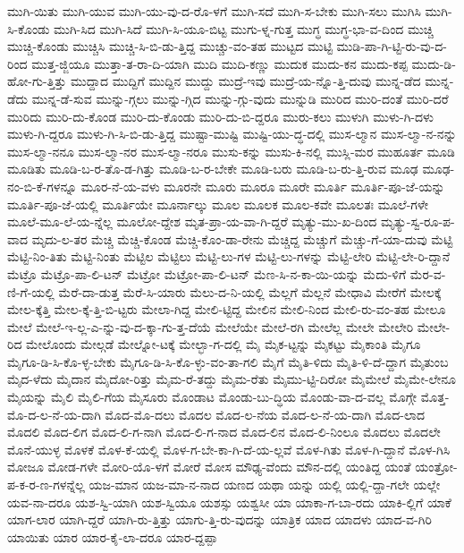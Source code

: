 {ಮುಗಿ-ಯಿತು
ಮುಗಿ-ಯುವ
ಮುಗಿ-ಯು-ವು-ದ-ರೊ-ಳಗೆ
ಮುಗಿ-ಸದೆ
ಮುಗಿ-ಸ-ಬೇಕು
ಮುಗಿ-ಸಲು
ಮುಗಿಸಿ
ಮುಗಿ-ಸಿ-ಕೊಂಡು
ಮುಗಿ-ಸಿದ
ಮುಗಿ-ಸಿದೆ
ಮುಗಿ-ಸಿ-ಯೂ-ಬಿಟ್ಟ
ಮುಗು-ಳ್ನ-ಗುತ್ತ
ಮುಗ್ಧ
ಮುಗ್ಧ-ಭಾ-ವ-ದಿಂದ
ಮುಚ್ಚಿ
ಮುಚ್ಚಿ-ಕೊಂಡು
ಮುಚ್ಚಿಸಿ
ಮುಚ್ಚಿ-ಸಿ-ಬಿ-ಡು-ತ್ತಿದ್ದ
ಮುಚ್ಚು-ವಂ-ತಹ
ಮುಟ್ಟದ
ಮುಟ್ಟಿ
ಮುಡಿ-ಪಾ-ಗಿ-ಟ್ಟಿ-ರು-ವು-ದ-ರಿಂದ
ಮುತ್ತ-ಜ್ಜಿಯೂ
ಮುತ್ತಾ-ತ-ರಾ-ದಿ-ಯಾಗಿ
ಮುದಿ
ಮುದಿ-ಕಣ್ಣು
ಮುದುಕ
ಮುದು-ಕನ
ಮುದು-ಕಪ್ಪ
ಮುದು-ಡಿ-ಹೋ-ಗು-ತ್ತಿತ್ತು
ಮುದ್ದಾದ
ಮುದ್ದಿಗೆ
ಮುದ್ದಿನ
ಮುದ್ದು
ಮುದ್ರೆ-ಇವು
ಮುದ್ರೆ-ಯ-ನ್ನೊ-ತ್ತಿ-ದುವು
ಮುನ್ನ-ಡೆದ
ಮುನ್ನ-ಡೆದು
ಮುನ್ನ-ಡೆ-ಸುವ
ಮುನ್ನು-ಗ್ಗಲು
ಮುನ್ನು-ಗ್ಗಿದ
ಮುನ್ನು-ಗ್ಗು-ವುದು
ಮುನ್ನುಡಿ
ಮುರಿದ
ಮುರಿ-ದಂತೆ
ಮುರಿ-ದರೆ
ಮುರಿದು
ಮುರಿ-ದು-ಕೊಂಡ
ಮುರಿ-ದು-ಕೊಂಡು
ಮುರಿ-ದು-ಬಿ-ದ್ದರೂ
ಮುರು-ಕಲು
ಮುಳುಗಿ
ಮುಳು-ಗಿ-ದಳು
ಮುಳು-ಗಿ-ದ್ದರೂ
ಮುಳು-ಗಿ-ಸಿ-ಬಿ-ಡು-ತ್ತಿದ್ದ
ಮುಷ್ಟಾ-ಮುಷ್ಟಿ
ಮುಷ್ಟಿ-ಯು-ದ್ಧ-ದಲ್ಲಿ
ಮುಸ-ಲ್ಮಾನ
ಮುಸ-ಲ್ಮಾ-ನ-ನನ್ನು
ಮುಸ-ಲ್ಮಾ-ನನೂ
ಮುಸ-ಲ್ಮಾ-ನರ
ಮುಸ-ಲ್ಮಾ-ನರೂ
ಮುಸು-ಕನ್ನು
ಮುಸು-ಕಿ-ನಲ್ಲಿ
ಮುಸ್ಲಿ-ಮರ
ಮುಹೂರ್ತ
ಮೂಡಿ
ಮೂಡಿತು
ಮೂಡಿ-ಬ-ರ-ತೊ-ಡ-ಗಿತ್ತು
ಮೂಡಿ-ಬ-ರ-ಬೇಕೇ
ಮೂಡಿ-ಬರು
ಮೂಡಿ-ಬ-ರು-ತ್ತಿ-ರುವ
ಮೂಢ
ಮೂಢ-ನಂ-ಬಿ-ಕೆ-ಗಳನ್ನೂ
ಮೂರ-ನೆ-ಯ-ವಳು
ಮೂರನೇ
ಮೂರು
ಮೂರೂ
ಮೂರೇ
ಮೂರ್ತಿ
ಮೂರ್ತಿ-ಪೂ-ಜೆ-ಯನ್ನು
ಮೂರ್ತಿ-ಪೂ-ಜೆ-ಯಲ್ಲಿ
ಮೂರ್ತಿಯೇ
ಮೂರ್ನಾಲ್ಕು
ಮೂಲ
ಮೂಲಕ
ಮೂಲ-ಕವೇ
ಮೂಲತಃ
ಮೂಲೆ-ಗಳೇ
ಮೂಲೆ-ಮೂ-ಲೆ-ಯ-ನ್ನೆಲ್ಲ
ಮೂಲೋ-ದ್ದೇಶ
ಮೃತ-ಪ್ರಾ-ಯ-ವಾ-ಗಿ-ದ್ದರೆ
ಮೃತ್ಯು-ಮು-ಖ-ದಿಂದ
ಮೃತ್ಯು-ಸ್ವ-ರೂ-ಪ-ವಾದ
ಮೃದು-ಲ-ತರ
ಮೆಚ್ಚಿ
ಮೆಚ್ಚಿ-ಕೊಂಡ
ಮೆಚ್ಚಿ-ಕೊಂ-ಡಾ-ರೇನು
ಮೆಚ್ಚಿದ್ದ
ಮೆಚ್ಚುಗೆ
ಮೆಚ್ಚು-ಗೆ-ಯಾ-ದುವು
ಮೆಟ್ಟಿ
ಮೆಟ್ಟಿ-ನಿಂ-ತಿತು
ಮೆಟ್ಟಿ-ನಿಂತು
ಮೆಟ್ಟಿಲ
ಮೆಟ್ಟಿಲು
ಮೆಟ್ಟಿ-ಲು-ಗಳ
ಮೆಟ್ಟಿ-ಲು-ಗಳನ್ನು
ಮೆಟ್ಟಿ-ಲೇರಿ
ಮೆಟ್ಟಿ-ಲೇ-ರಿ-ದ್ದಾನೆ
ಮೆಟ್ರೊ
ಮೆಟ್ರೊ-ಪಾ-ಲಿ-ಟನ್
ಮೆಟ್ರೋ
ಮೆಟ್ರೋ-ಪಾ-ಲಿ-ಟನ್
ಮೆಣ-ಸಿ-ನ-ಕಾ-ಯಿ-ಯನ್ನು
ಮೆದು-ಳಿಗೆ
ಮೆರ-ವ-ಣಿ-ಗೆ-ಯಲ್ಲಿ
ಮೆರೆ-ದಾ-ಡುತ್ತ
ಮೆರೆ-ಸಿ-ಯಾರು
ಮೆಲು-ದ-ನಿ-ಯಲ್ಲಿ
ಮೆಲ್ಲಗೆ
ಮೆಲ್ಲನೆ
ಮೇಧಾವಿ
ಮೇರೆಗೆ
ಮೇಲಕ್ಕೆ
ಮೇಲ-ಕ್ಕೆತ್ತಿ
ಮೇಲ-ಕ್ಕೆ-ತ್ತಿ-ಬಿ-ಟ್ಟರು
ಮೇಲಾ-ಗಿದ್ದ
ಮೇಲಿ-ಟ್ಟಿದ್ದ
ಮೇಲಿನ
ಮೇಲಿ-ನಿಂದ
ಮೇಲಿ-ರು-ವಂ-ತಹ
ಮೇಲೂ
ಮೇಲೆ
ಮೇಲೆ-ಇ-ಲ್ಲ-ಎ-ನ್ನು-ವು-ದ-ಕ್ಕಾ-ಗು-ತ್ತ-ದೆಯೆ
ಮೇಲೆಯೇ
ಮೇಲೆ-ರಗಿ
ಮೇಲೆಲ್ಲ
ಮೇಲೇ
ಮೇಲೇರಿ
ಮೇಲೇ-ರಿದ
ಮೇಲೊಂದು
ಮೇಲ್ಗಡೆ
ಮೇಲ್ನೋ-ಟಕ್ಕೆ
ಮೇಲ್ಭಾ-ಗ-ದಲ್ಲಿ
ಮೈ
ಮೈಕ-ಟ್ಟನ್ನು
ಮೈಕಟ್ಟು
ಮೈಕಾಂತಿ
ಮೈಗೂ
ಮೈಗೂ-ಡಿ-ಸಿ-ಕೊ-ಳ್ಳ-ಬೇಕು
ಮೈಗೂ-ಡಿ-ಸಿ-ಕೊ-ಳ್ಳು-ವಂ-ತಾ-ಗಲಿ
ಮೈಗೆ
ಮೈತಿ-ಳಿದು
ಮೈತಿ-ಳಿ-ದೆ-ದ್ದಾಗ
ಮೈತುಂಬ
ಮೈದ-ಳೆದು
ಮೈದಾನ
ಮೈದೋ-ರಿತ್ತು
ಮೈಮ-ರೆ-ತದ್ದು
ಮೈಮ-ರೆತು
ಮೈಮು-ಟ್ಟಿ-ದಿರೋ
ಮೈಮೇಲೆ
ಮೈಮೇ-ಲೇನೂ
ಮೈಯನ್ನು
ಮೈಲಿ
ಮೈಲಿ-ಗೆಯ
ಮೈಸೂರು
ಮೊಂಡಾಟ
ಮೊಂಡು-ಬು-ದ್ಧಿಯ
ಮೊಂಡು-ವಾ-ದ-ವಲ್ಲ
ಮೊಗ್ಗೇ
ಮೊತ್ತ-ಮೊ-ದ-ಲ-ನೆ-ಯ-ದಾಗಿ
ಮೊದ-ಮೊ-ದಲು
ಮೊದಲ
ಮೊದ-ಲ-ನೆಯ
ಮೊದ-ಲ-ನೆ-ಯ-ದಾಗಿ
ಮೊದ-ಲಾದ
ಮೊದಲಿ
ಮೊದ-ಲಿಗ
ಮೊದ-ಲಿ-ಗ-ನಾಗಿ
ಮೊದ-ಲಿ-ಗ-ನಾದ
ಮೊದ-ಲಿನ
ಮೊದ-ಲಿ-ನಿಂಲೂ
ಮೊದಲು
ಮೊದಲೇ
ಮೊನೆ-ಯುಳ್ಳ
ಮೊಳಕೆ
ಮೊಳ-ಕೆ-ಯಲ್ಲಿ
ಮೊಳ-ಗ-ಬೇ-ಕಾ-ಗಿ-ದೆ-ಯ-ಲ್ಲವೆ
ಮೊಳ-ಗಿತು
ಮೊಳ-ಗಿ-ದ್ದಾನೆ
ಮೊಳ-ಗಿಸಿ
ಮೋಜೂ
ಮೋಡ-ಗಳೇ
ಮೋರಿ-ಯೊ-ಳಗೆ
ಮೋರೆ
ಮೋಸ
ಮೌಢ್ಯ-ವೆಂದು
ಮೌನ-ದಲ್ಲಿ
ಯಂತಿದ್ದ
ಯಂತೆ
ಯಂತ್ರೋ-ಪ-ಕ-ರ-ಣ-ಗಳನ್ನೆಲ್ಲ
ಯಜ-ಮಾನ
ಯಜ-ಮಾ-ನ-ನಾದ
ಯಣದ
ಯಥಾ
ಯನ್ನು
ಯಲ್ಲಿ
ಯಲ್ಲಿ-ದ್ದಾ-ಗಲೇ
ಯಲ್ಲೇ
ಯವ-ನಾ-ದರೂ
ಯಶ-ಸ್ವಿ-ಯಾಗಿ
ಯಶ-ಸ್ವಿಯೂ
ಯಶಸ್ಸು
ಯಶ್ವಸೀ
ಯಾ
ಯಾಕಾ-ಗ-ಬಾ-ರದು
ಯಾಕಿ-ಲ್ಲಿಗೆ
ಯಾಕೆ
ಯಾಗ-ಲಾರ
ಯಾಗಿ-ದ್ದರೆ
ಯಾಗಿ-ರು-ತ್ತಿತ್ತು
ಯಾಗು-ತ್ತಿ-ರು-ವುದನ್ನು
ಯಾತ್ರಿಕ
ಯಾದ
ಯಾದಳು
ಯಾದ-ವ-ಗಿರಿ
ಯಾಯಿತು
ಯಾರ
ಯಾರ-ಕೈ-ಲಾ-ದರೂ
ಯಾರ-ದ್ದಪ್ಪಾ
}
